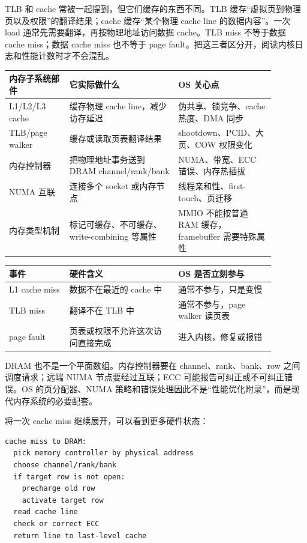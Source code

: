 TLB 和 cache 常被一起提到，但它们缓存的东西不同。TLB 缓存“虚拟页到物理页以及权限”的翻译结果；cache 缓存“某个物理 cache line 的数据内容”。一次 load 通常先需要翻译，再按物理地址访问数据 cache。TLB miss 不等于数据 cache miss；数据 cache miss 也不等于 page fault。把这三者区分开，阅读内核日志和性能计数时才不会混乱。

\begin{longtable}{p{0.2\linewidth}p{0.36\linewidth}p{0.32\linewidth}}
\toprule
内存子系统部件 & 它实际做什么 & OS 关心点 \\
\midrule
L1/L2/L3 cache & 缓存物理 cache line，减少访存延迟 & 伪共享、锁竞争、cache 热度、DMA 同步 \\
TLB/page walker & 缓存或读取页表翻译结果 & shootdown、PCID、大页、COW 权限变化 \\
内存控制器 & 把物理地址事务送到 DRAM channel/rank/bank & NUMA、带宽、ECC 错误、内存热插拔 \\
NUMA 互联 & 连接多个 socket 或内存节点 & 线程亲和性、first-touch、页迁移 \\
内存类型机制 & 标记可缓存、不可缓存、write-combining 等属性 & MMIO 不能按普通 RAM 缓存，framebuffer 需要特殊属性 \\
\bottomrule
\end{longtable}

\begin{longtable}{p{0.2\linewidth}p{0.36\linewidth}p{0.32\linewidth}}
\toprule
事件 & 硬件含义 & OS 是否立刻参与 \\
\midrule
L1 cache miss & 数据不在最近的 cache 中 & 通常不参与，只是变慢 \\
TLB miss & 翻译不在 TLB 中 & 通常不参与，page walker 读页表 \\
page fault & 页表或权限不允许这次访问直接完成 & 进入内核，修复或报错 \\
\bottomrule
\end{longtable}

DRAM 也不是一个平面数组。内存控制器要在 channel、rank、bank、row 之间调度请求；远端 NUMA 节点要经过互联；ECC 可能报告可纠正或不可纠正错误。OS 的页分配器、NUMA 策略和错误处理因此不是“性能优化附录”，而是现代内存系统的必要配套。

将一次 cache miss 继续展开，可以看到更多硬件状态：

\begin{lstlisting}
cache miss to DRAM:
  pick memory controller by physical address
  choose channel/rank/bank
  if target row is not open:
    precharge old row
    activate target row
  read cache line
  check or correct ECC
  return line to last-level cache
\end{lstlisting}

